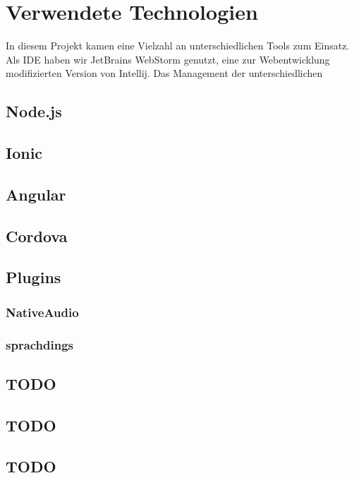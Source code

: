 
\section{Verwendete Technologien}
In diesem Projekt kamen eine Vielzahl an unterschiedlichen Tools zum Einsatz. Als IDE haben wir JetBrains WebStorm genutzt, eine zur Webentwicklung modifizierten Version von Intellij. Das Management der unterschiedlichen

\subsection{Node.js}

\subsection{Ionic}

\subsection{Angular}

\subsection{Cordova}

\subsection{Plugins}

\subsubsection*{NativeAudio}

\subsubsection*{sprachdings}

\subsection{TODO}


\subsection{TODO}


\subsection{TODO}
